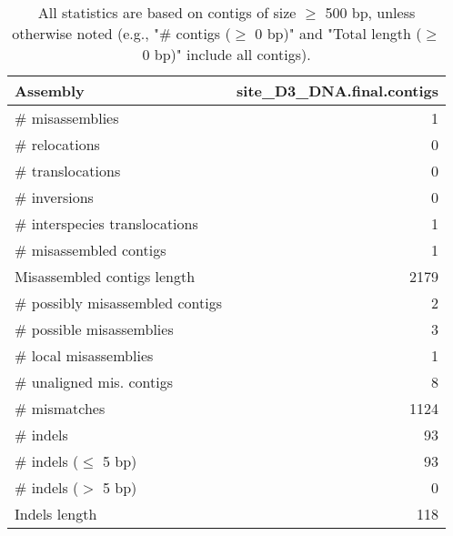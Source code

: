 \documentclass[12pt,a4paper]{article}
\begin{document}
\begin{table}[ht]
\begin{center}
\caption{All statistics are based on contigs of size $\geq$ 500 bp, unless otherwise noted (e.g., "\# contigs ($\geq$ 0 bp)" and "Total length ($\geq$ 0 bp)" include all contigs).}
\begin{tabular}{|l*{1}{|r}|}
\hline
Assembly & site\_D3\_DNA.final.contigs \\ \hline
\# misassemblies & 1 \\ \hline
\hspace{5mm}\# relocations & 0 \\ \hline
\hspace{5mm}\# translocations & 0 \\ \hline
\hspace{5mm}\# inversions & 0 \\ \hline
\hspace{5mm}\# interspecies translocations & 1 \\ \hline
\# misassembled contigs & 1 \\ \hline
Misassembled contigs length & 2179 \\ \hline
\# possibly misassembled contigs & 2 \\ \hline
\hspace{5mm}\# possible misassemblies & 3 \\ \hline
\# local misassemblies & 1 \\ \hline
\# unaligned mis. contigs & 8 \\ \hline
\# mismatches & 1124 \\ \hline
\# indels & 93 \\ \hline
\hspace{5mm}\# indels ($\leq$ 5 bp) & 93 \\ \hline
\hspace{5mm}\# indels ($>$ 5 bp) & 0 \\ \hline
Indels length & 118 \\ \hline
\end{tabular}
\end{center}
\end{table}
\end{document}
